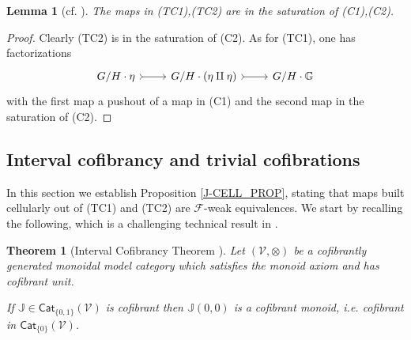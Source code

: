 \documentclass[a4paper,10pt
,draft
]{article}%
\numberwithin{equation}{section}
\numberwithin{figure}{section}
\newtheorem{theorem}[equation]{Theorem}%
\newtheorem{lemma}[equation]{Lemma}%
\theoremstyle{definition} %
\newtheorem{remark}[equation]{Remark}%
\newcommand{\F}{\ensuremath{\mathcal F}}
\newcommand{\V}{\ensuremath{\mathcal V}}
\newcommand{\1}{\ensuremath{\mathbbm 1}}%
\begin{document}




\begin{lemma}[{cf. \cite[1.19]{CM13b}}]\label{POINT_4_LEMMA}
	The maps in (TC1),(TC2) are in the saturation of (C1),(C2).
\end{lemma}

\begin{proof}
	Clearly (TC2) is in the saturation of (C2).
	As for (TC1), one has factorizations
\begin{equation}
	\begin{tikzcd}
	G/H \cdot \eta \arrow[r, rightarrowtail]
&
	G/H \cdot (\eta \amalg \eta) \arrow[r, rightarrowtail]
&
	G/H \cdot \mathbb{G}
	\end{tikzcd}
\end{equation}
with the first map a pushout of a map in (C1) and 
the second map in the saturation of (C2).
\end{proof}





\subsection{Interval cofibrancy and trivial cofibrations}
\label{TRIVCOF_SEC}


In this section we establish Proposition \ref{J-CELL_PROP},
stating that maps built cellularly out of
(TC1) and (TC2) are $\F$-weak equivalences.
We start by recalling the following, 
which is a challenging technical result in \cite{BM13}.


\begin{theorem}
[Interval Cofibrancy Theorem {\cite[Thm. 1.15]{BM13}}]
\label{INTCOF THM}
Let $(\V,\otimes)$ be a cofibrantly generated monoidal model category which
satisfies the monoid axiom and has cofibrant unit.

If $\mathbb{J} \in \mathsf{Cat}_{\{0,1\}}(\V)$
is cofibrant then 
$\mathbb{J}(0,0)$ 
is a cofibrant monoid, i.e. cofibrant
in $ \mathsf{Cat}_{\{0\}}(\V)$.
\end{theorem}
\end{document}
